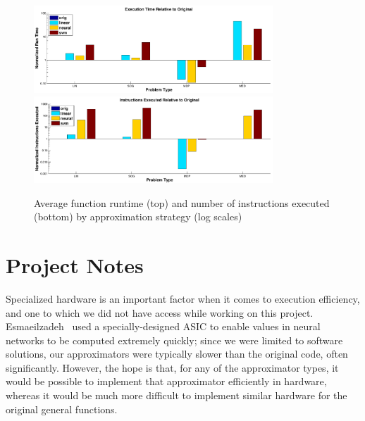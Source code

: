 \documentclass{article}
\begin{document}
\begin{figure}
  \centering
  \includegraphics[width=0.8\textwidth]{images/results_run_time}
  \includegraphics[width=0.8\textwidth]{images/results_instructions}
  \caption{Average function runtime (top) and number of instructions executed (bottom) by approximation strategy (log scales)}
  \label{fig:results_run_time}
\end{figure}

\section{Project Notes}
\label{sec:project_notes}

Specialized hardware is an important factor when it comes to execution efficiency, and one to which we did not have access while working on this project. Esmaeilzadeh~\cite{Esmaeilzadeh12} used a specially-designed ASIC to enable values in neural networks to be computed extremely quickly; since we were limited to software solutions, our approximators were typically slower than the original code, often significantly. However, the hope is that, for any of the approximator types, it would be possible to implement that approximator efficiently in hardware, whereas it would be much more difficult to implement similar hardware for the original general functions.



\end{document}
